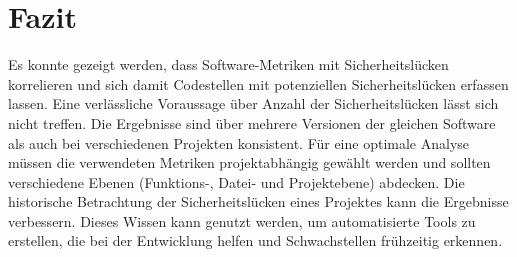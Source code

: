 \section{Fazit}
\label{sec:fazit}
Es konnte gezeigt werden, dass Software-Metriken mit Sicherheitslücken korrelieren und sich damit Codestellen mit potenziellen Sicherheitslücken erfassen lassen.
Eine verlässliche Voraussage über Anzahl der Sicherheitslücken lässt sich nicht treffen.
Die Ergebnisse sind über mehrere Versionen der gleichen Software als auch bei verschiedenen Projekten konsistent.
Für eine optimale Analyse müssen die verwendeten Metriken projektabhängig gewählt werden und sollten verschiedene Ebenen (Funktions-, Datei- und Projektebene) abdecken.
Die historische Betrachtung der Sicherheitslücken eines Projektes kann die Ergebnisse verbessern.
Dieses Wissen kann genutzt werden, um automatisierte Tools zu erstellen, die bei der Entwicklung helfen und Schwachstellen frühzeitig erkennen.
